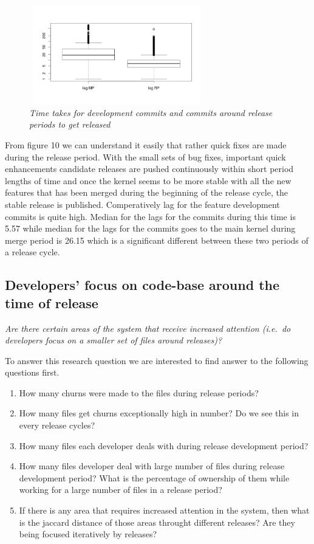 \documentclass{acm_proc_article-sp}
\begin{document}
\begin{figure}
\begin{center}
\includegraphics[height=1.7in,width=3in]{lagMPRPbox.png}
\caption{\small \sl Time takes for development commits and commits around release periods to get released}
\end{center}
\end{figure}

From figure 10 we can understand it easily that rather quick fixes are made during the release period. With the small sets of bug fixes, important quick enhancements candidate releases are pushed continuously within short period lengths of time and once the kernel seems to be more stable with all the new features that has been merged during the beginning of the release cycle, the stable release is published. Comperatively lag for the feature development commits is quite high. Median for the lags for the commits during this time is 5.57 while median for the lags for the commits goes to the main kernel during merge period is 26.15 which is a significant different between these two periods of a release cycle.

\subsection{Developers' focus on code-base around the time of release}
\textit{Are there certain areas of the system that receive increased attention (i.e.\ do developers focus on a smaller set of files around releases)?}

To answer this research question we are interested to find answer to the following questions first.
\renewcommand{\labelenumi}{q\theenumi:}
\begin{enumerate}
\item{How many churns were made to the files during release periods?}
\item{How many files get churns exceptionally high in number? Do we see this in every release cycles?}
\item{How many files each developer deals with during release development period?}
\item{How many files developer deal with large number of files during release development period? What is the percentage of ownership of them while working for a large number of files in a release period?}
\item{If there is any area that requires increased attention in the system, then what is the jaccard distance of those areas throught different releases? Are they being focused iteratively by releases?}
\end{enumerate}
\end{document}
